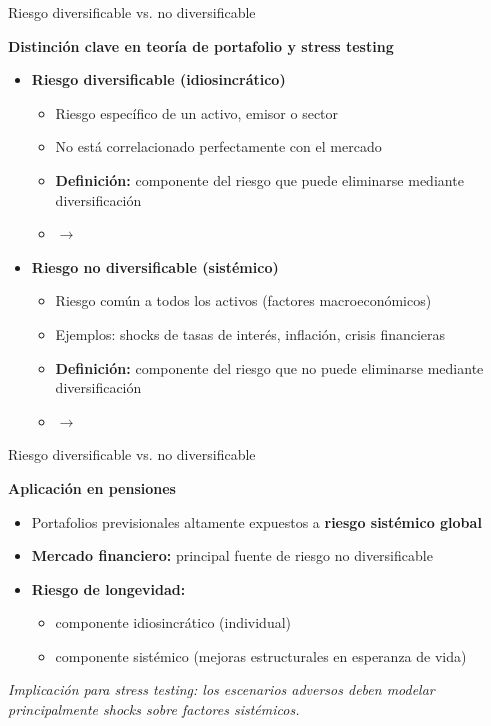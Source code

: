 \documentclass{beamer}
\begin{document}
\begin{frame}[t]{Riesgo diversificable vs. no diversificable}

\textbf{Distinción clave en teoría de portafolio y stress testing}

\begin{itemize}

    \item \textbf{Riesgo diversificable (idiosincrático)}  
    \begin{itemize}
        \item Riesgo específico de un activo, emisor o sector
        \item No está correlacionado perfectamente con el mercado
        \item \textbf{Definición:} componente del riesgo que puede eliminarse mediante diversificación
        \item $\rightarrow$ 
    \end{itemize}
    
   
    \item \textbf{Riesgo no diversificable (sistémico)}  
    \begin{itemize}
        \item Riesgo común a todos los activos (factores macroeconómicos)
        \item Ejemplos: shocks de tasas de interés, inflación, crisis financieras
        \item \textbf{Definición:} componente del riesgo que no puede eliminarse mediante diversificación
        \item $\rightarrow$ 
    \end{itemize}
     
\end{itemize}

\end{frame}
\begin{frame}[t]{Riesgo diversificable vs. no diversificable}

  \textbf{Aplicación en pensiones}
    \begin{itemize}
        \item Portafolios previsionales altamente expuestos a \textbf{riesgo sistémico global}
        \item \textbf{Mercado financiero:} principal fuente de riesgo no diversificable
        \item \textbf{Riesgo de longevidad:} 
        \begin{itemize}
            \item componente idiosincrático (individual)
            \item componente sistémico (mejoras estructurales en esperanza de vida)
        \end{itemize}
    \end{itemize}

\vspace{0.3cm}
\textit{Implicación para stress testing: los escenarios adversos deben modelar principalmente shocks sobre factores sistémicos.}
    
\end{frame}
\end{document}
